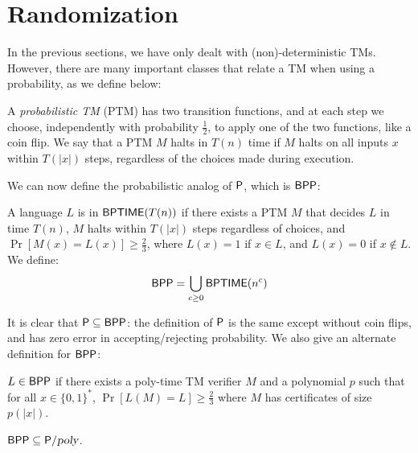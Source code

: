 \section{Randomization}

In the previous sections, we have only dealt with (non)-deterministic TMs. However, there are many important classes that relate a TM when using a probability, as we define below:

\begin{definition}
A \emph{probabilistic TM} (PTM) has two transition functions, and at each step we choose, independently with probability $\frac{1}{2}$, to apply one of the two functions, like a coin flip. We say that a PTM $M$ halts in $T(n)$ time if $M$ halts on all inputs $x$ within $T(|x|)$ steps, regardless of the choices made during execution.
\end{definition}

We can now define the probabilistic analog of $\P$, which is $\BPP$:
\begin{definition}
A language $L$ is in $\BPTIME(T(n))$ if there exists a PTM $M$ that decides $L$ in time $T(n)$, $M$ halts within $T(|x|)$ steps regardless of choices, and $\Pr[M(x) = L(x)] \ge \frac{2}{3}$, where $L(x) = 1$ if $x \in L$, and $L(x) = 0$ if $x \notin L$. We define:
\[
\BPP = \bigcup_{c \ge 0}\BPTIME(n^c)
\]
\end{definition}

It is clear that $\P \subseteq \BPP$: the definition of $\P$ is the same except without coin flips, and has zero error in accepting/rejecting probability. We also give an alternate definition for $\BPP$:
\begin{definition}
$L \in \BPP$ if there exists a poly-time TM verifier $M$ and a polynomial $p$ such that for all $x \in \{0, 1\}^*$, $\Pr[L(M) = L] \ge \frac{2}{3}$ where $M$ has certificates of size $p(|x|)$.
\end{definition}

\begin{theorem}
$\BPP \subseteq \Ppoly$.
\end{theorem}

